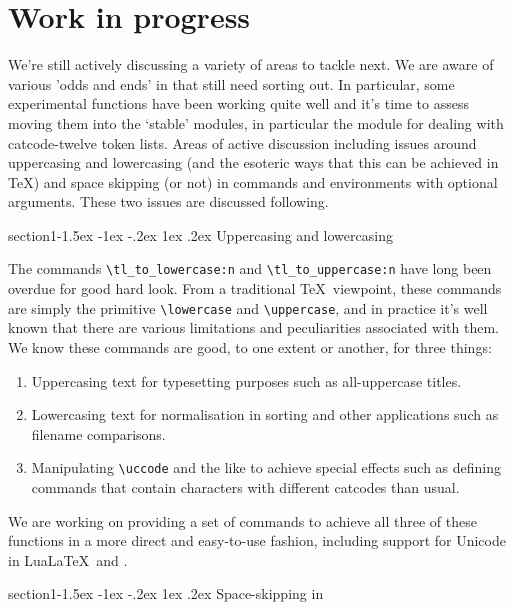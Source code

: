 \documentclass{ltnews}
\makeatletter
\newcommand{\@subheadingfont}{%
   \sffamily\slshape
   \let\LaTeX\cmssLaTeX\let\TeX\cmssTeX
}
\renewcommand{\subsection}{%
   \@startsection
      {section}{1}{\z@}{-1.5ex \@plus -1ex \@minus -.2ex}%
      {1ex \@plus.2ex}{\@subheadingfont}%
}
\providecommand\LuaLaTeX{Lua\LaTeX}
\makeatother
\begin{document}
\section{Work in progress}

We're still actively discussing a variety of areas to tackle next.
We are aware of various 'odds and ends' in  that still need sorting out.
In particular, some experimental functions have been working quite well and it's time to assess moving them into the `stable' modules, in particular the  module for dealing with catcode-twelve token lists.
Areas of active discussion including issues around uppercasing and lowercasing (and the esoteric ways that this can be achieved in \TeX) and space skipping (or not) in commands and environments with optional arguments.
These two issues are discussed following.

\subsection{Uppercasing and lowercasing}

The commands \verb"\tl_to_lowercase:n" and \verb"\tl_to_uppercase:n" have long been overdue for good hard look.
From a traditional \TeX\ viewpoint, these commands are simply the primitive \verb"\lowercase" and \verb"\uppercase", and in practice it's well known that there are various limitations and peculiarities associated with them.
We know these commands are good, to one extent or another, for three things:
\begin{enumerate}
\item
Uppercasing text for typesetting purposes such as all-uppercase titles.
\item
Lowercasing text for normalisation in sorting and other applications such as filename comparisons.
\item
Manipulating \verb"\uccode" and the like to achieve special effects such as defining commands that contain characters with different catcodes than usual.
\end{enumerate}
We are working on providing a set of commands to achieve all three of these functions in a more direct and easy-to-use fashion, including support for Unicode in \LuaLaTeX\ and \XeLaTeX.

\subsection{Space-skipping in }
\end{document}
